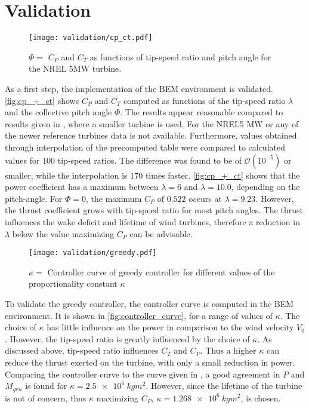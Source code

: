 \section{Validation}
\begin{figure}[h]
	\centering
	\texttt{[image: validation/cp\_ct.pdf]}
	\caption{$\Phi =$ 
		$C_P$ and $C_T$ as functions of tip-speed ratio and pitch angle for the NREL 5MW turbine.}
	\label{fig:cp_+_ct}
\end{figure}
As a first step, the implementation of the BEM environment is validated. \autoref{fig:cp_+_ct} shows $C_P$ and $C_T$ computed as functions of the tip-speed ratio $\lambda$ and the collective pitch angle $\Phi$. The results appear reasonable compared to results given in \cite{hansen_aerodynamics_2008}, where a smaller turbine is used. For the NREL5 MW or any of the newer reference turbines data is not available. Furthermore, values obtained through interpolation of the precomputed table were compared to calculated values for $100$ tip-speed ratios. The difference was found to be of $\mathcal{O}\left(10^{-5}\right)$ or smaller, while the interpolation is $170$ times faster. \autoref{fig:cp_+_ct} shows that the power coefficient has a maximum between $\lambda=6$ and $\lambda=10.0$, depending on the pitch-angle. For $\Phi=0$, the maximum $C_P$ of $0.522$ occurs at $\lambda=9.23$. However, the thrust coefficient grows with tip-speed ratio for most pitch angles. The thrust influences the wake deficit and lifetime of wind turbines, therefore a reduction in $\lambda$ below the value maximizing $C_P$ can be advisable.\newpage
\begin{figure}[ht]
	\centering
	\texttt{[image: validation/greedy.pdf]}
	\caption{$\kappa =$ Controller curve of greedy controller for different values of the proportionality constant $\kappa$}
	\label{fig:controller_curve}
\end{figure}
To validate the greedy controller, the controller curve is computed in the BEM environment. It is shown in \autoref{fig:controller_curve}, for a range of values of $\kappa$. The choice of $\kappa$ has little influence on the power in comparison to the wind velocity $V_0$. However, the tip-speed ratio is greatly influenced by the choice of $\kappa$. As discussed above, tip-speed ratio influences $C_T$ and $C_P$. Thus a higher $\kappa$ can reduce the thrust exerted on the turbine, with only a small reduction in power. Comparing the controller curve to the curve given in \cite{jonkman_definition_2009}, a good agreement in $P$ and $M_{gen}$ is found for $\kappa=\SI{2.5e6}{kgm^2}$. However, since the lifetime of the turbine is not of concern, thus $\kappa$ maximizing $C_P$,  $\kappa = \SI{1.268e6}{kgm^2}$, is chosen. \\
